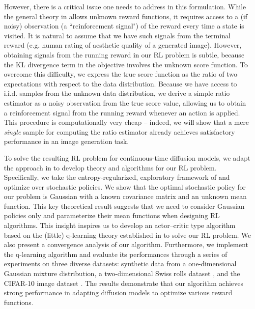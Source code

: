 \documentclass[11pt]{article}
\begin{document}
However, there is a critical issue one needs to address in this formulation. While the general theory in \citep{Wang20, JZ21, JZ22, jia2023q} allows unknown reward functions, it requires access to a (if noisy) observation (a ``reinforcement signal") of the reward every time a state is visited.
It is natural to assume  that we have such signals from the terminal reward (e.g. human rating of aesthetic quality of a generated image). However, obtaining signals from the running reward in our RL problem is subtle, because the KL divergence term in the objective involves the unknown score function. To overcome this difficulty, we express the true score function as the ratio of two expectations with respect to the data distribution. Because we have access to i.i.d. samples from the unknown data distribution, we derive a simple ratio estimator as a noisy observation from the true score value, allowing us to obtain a reinforcement signal from the running reward whenever an action is applied. This procedure is computationally very cheap -- indeed, we will show that a mere {\it single}  sample for computing the ratio estimator already achieves satisfactory performance in an image generation task. %

To solve the resulting RL problem for continuous-time diffusion models, we adapt the approach in \cite{jia2023q} to develop theory and algorithms for our RL problem. Specifically, we take
the entropy-regularized, exploratory framework of \cite{Wang20} and optimize over stochastic policies. We show that the optimal stochastic policy for our problem is Gaussian with a known covariance matrix and an unknown mean function.
This key theoretical result suggests that we need to consider Gaussian policies only and parameterize their mean functions when designing RL algorithms.
This insight inspires us to develop an actor--critic type algorithm based on the (little) q-learning theory established in \cite{jia2023q} to solve our RL problem.  We also present a convergence analysis of our algorithm. Furthermore, we implement the q-learning algorithm and evaluate its performances through a series of experiments on three diverse datasets: synthetic data from a one-dimensional Gaussian mixture distribution, a two-dimensional Swiss rolls dataset \citep{sohl2015deep, lai2023fp}, and the CIFAR-10 image dataset \citep{krizhevsky2009learning}. The results demonstrate that our algorithm achieves strong performance in adapting diffusion models to optimize
various reward functions.
\end{document}
